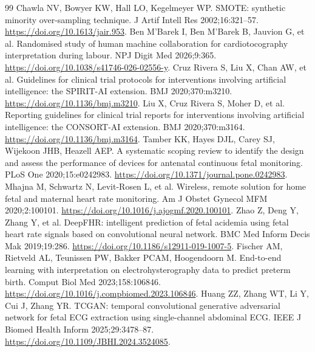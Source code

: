 \begin{thebibliography}{99}
 Chawla NV, Bowyer KW, Hall LO, Kegelmeyer WP. SMOTE: synthetic minority over-sampling technique. J Artif Intell Res 2002;16:321--57. \href{https://doi.org/10.1613/jair.953}{https://doi.org/10.1613/jair.953}.
 Ben M'Barek I, Ben M'Barek B, Jauvion G, et al. Randomised study of human machine collaboration for cardiotocography interpretation during labour. NPJ Digit Med 2026;9:365. \href{https://doi.org/10.1038/s41746-026-02556-y}{https://doi.org/10.1038/s41746-026-02556-y}.
 Cruz Rivera S, Liu X, Chan AW, et al. Guidelines for clinical trial protocols for interventions involving artificial intelligence: the SPIRIT-AI extension. BMJ 2020;370:m3210. \href{https://doi.org/10.1136/bmj.m3210}{https://doi.org/10.1136/bmj.m3210}.
 Liu X, Cruz Rivera S, Moher D, et al. Reporting guidelines for clinical trial reports for interventions involving artificial intelligence: the CONSORT-AI extension. BMJ 2020;370:m3164. \href{https://doi.org/10.1136/bmj.m3164}{https://doi.org/10.1136/bmj.m3164}.
 Tamber KK, Hayes DJL, Carey SJ, Wijekoon JHB, Heazell AEP. A systematic scoping review to identify the design and assess the performance of devices for antenatal continuous fetal monitoring. PLoS One 2020;15:e0242983. \href{https://doi.org/10.1371/journal.pone.0242983}{https://doi.org/10.1371/journal.pone.0242983}.
 Mhajna M, Schwartz N, Levit-Rosen L, et al. Wireless, remote solution for home fetal and maternal heart rate monitoring. Am J Obstet Gynecol MFM 2020;2:100101. \href{https://doi.org/10.1016/j.ajogmf.2020.100101}{https://doi.org/10.1016/j.ajogmf.2020.100101}.
 Zhao Z, Deng Y, Zhang Y, et al. DeepFHR: intelligent prediction of fetal acidemia using fetal heart rate signals based on convolutional neural network. BMC Med Inform Decis Mak 2019;19:286. \href{https://doi.org/10.1186/s12911-019-1007-5}{https://doi.org/10.1186/s12911-019-1007-5}.
 Fischer AM, Rietveld AL, Teunissen PW, Bakker PCAM, Hoogendoorn M. End-to-end learning with interpretation on electrohysterography data to predict preterm birth. Comput Biol Med 2023;158:106846. \href{https://doi.org/10.1016/j.compbiomed.2023.106846}{https://doi.org/10.1016/j.compbiomed.2023.106846}.
 Huang ZZ, Zhang WT, Li Y, Cui J, Zhang YR. TCGAN: temporal convolutional generative adversarial network for fetal ECG extraction using single-channel abdominal ECG. IEEE J Biomed Health Inform 2025;29:3478--87. \href{https://doi.org/10.1109/JBHI.2024.3524085}{https://doi.org/10.1109/JBHI.2024.3524085}.

\end{thebibliography}
